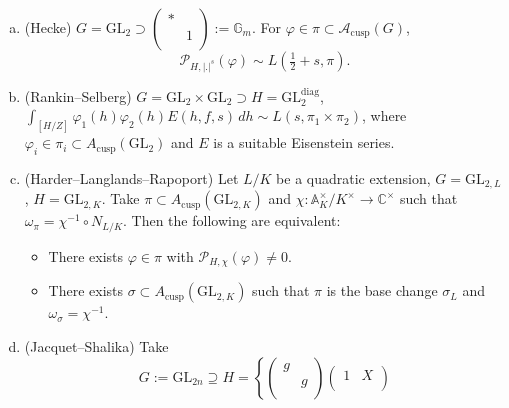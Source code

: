 \documentclass[reqno]{amsart} 
\numberwithin{theorem}{section}
\numberwithin{equation}{section}
\numberwithin{exercise}{section}
\begin{document}
\begin{example}\label{example:cq6tho6g4r}
  \begin{enumerate}[(a)]
  \item (Hecke) $G = \mathrm{GL}_2 \supset \left(
      \begin{smallmatrix}
        \ast&\\
                               &1 \\
      \end{smallmatrix}
    \right) := \mathbb{G}_m$.  For $\varphi \in \pi \subset \mathcal{A}_{\mathrm{cusp}}(G)$,
    \begin{equation*}
      \mathcal{P}_{H, \lvert . \rvert^s}(\varphi) \sim L(\tfrac{1}{2} + s, \pi).
    \end{equation*}
  \item (Rankin--Selberg) $G = \mathrm{GL}_2 \times \mathrm{GL}_2 \supset H = \mathrm{GL}_2^{\mathrm{diag}}$, $\int_{[H/Z]} \varphi_1(h) \varphi_2(h) E(h, f, s) \, d h \sim L(s, \pi_1 \times \pi_2)$, where $\varphi_i \in \pi_i \subset A_{\mathrm{cusp}}(\mathrm{GL}_2)$ and $E$ is a suitable Eisenstein series.
  \item (Harder--Langlands--Rapoport) Let $L/K$ be a quadratic extension, $G =\mathrm{GL}_{2, L}$, $H =\mathrm{GL}_{2, K}$.  Take $\pi \subset A_{\mathrm{cusp}}(\mathrm{GL}_{2, K})$ and $\chi : \mathbb{A}_K^\times / K^\times \rightarrow \mathbb{C}^\times$ such that $\omega_\pi = \chi^{-1} \circ N_{L/K}$.  Then the following are equivalent:
    \begin{itemize}
    \item There exists $\varphi \in \pi$ with $\mathcal{P}_{H, \chi}(\varphi) \neq 0$.
    \item There exists $\sigma \subset A_{\mathrm{cusp}}(\mathrm{GL}_{2, K})$ such that $\pi$ is the base change $\sigma_L$ and $\omega_\sigma = \chi^{-1}$.
    \end{itemize}
  \item (Jacquet--Shalika)
    Take
    \begin{equation*}
      G :=\mathrm{GL}_{2 n} \supseteq H = \left\{
        \begin{pmatrix}
          g &  \\
                                                                                             & g \\
        \end{pmatrix}
        \begin{pmatrix}
          1          & X \\

\end{pmatrix}
\end{equation*}
\end{enumerate}
\end{example}
\end{document}
